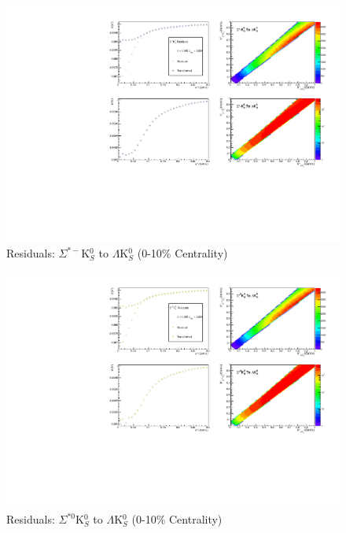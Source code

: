 \documentclass[../AnalysisNoteJBuxton.tex]{subfiles}
\begin{document}
\begin{figure}[h]
  \centering
  \includegraphics[width=\textwidth]{9_AdditionalFigures/Figures/Residuals/LamK0/Residuals_LamK0_0010_SigStMK0_MomResCrctn_NonFlatBgdCrctn_SingleLamParam_ResidualsIncluded_UsingCoulombOnlyInterpCfs.pdf}
  \caption[Residuals: $\Sigma^{*-}$K$^{0}_{S}$ to $\Lambda$K$^{0}_{S}$ (0-10\% Centrality)]{Residuals: $\Sigma^{*-}$K$^{0}_{S}$ to $\Lambda$K$^{0}_{S}$ (0-10\% Centrality)}
  \label{fig:Res_LamK0_0010_SigStMK0}
\end{figure}

\begin{figure}[h]
  \centering
  \includegraphics[width=\textwidth]{9_AdditionalFigures/Figures/Residuals/LamK0/Residuals_LamK0_0010_SigSt0K0_MomResCrctn_NonFlatBgdCrctn_SingleLamParam_ResidualsIncluded_UsingCoulombOnlyInterpCfs.pdf}
  \caption[Residuals: $\Sigma^{*0}$K$^{0}_{S}$ to $\Lambda$K$^{0}_{S}$ (0-10\% Centrality)]{Residuals: $\Sigma^{*0}$K$^{0}_{S}$ to $\Lambda$K$^{0}_{S}$ (0-10\% Centrality)}
  \label{fig:Res_LamK0_0010_SigSt0K0}
\end{figure}
\end{document}
